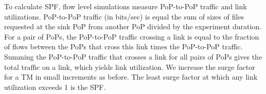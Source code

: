 




To calculate SPF, flow level simulations measure PoP-to-PoP traffic and link utilizations.
PoP-to-PoP traffic (in bits/sec) is equal the sum of sizes of files requested at the sink PoP from another PoP divided by the experiment duration.
For a pair of PoPs, the PoP-to-PoP traffic crossing a link is equal to the fraction of flows between the PoPs that cross this link times the PoP-to-PoP traffic.
Summing the PoP-to-PoP traffic that crosses a link for all pairs of PoPs gives the total traffic on a link, which yields link utilization.
We increase the surge factor  for a TM in small increments as before. The least surge factor at which any link utilization exceeds 1 is the SPF.

%



